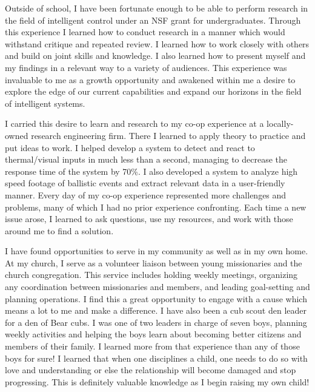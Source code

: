 \documentclass{article}
\begin{document}
Outside of school, I have been fortunate enough to be able to perform research in the field of intelligent control under an NSF grant for undergraduates. Through this experience I learned how to conduct research in a manner which would withstand critique and repeated review. I learned how to work closely with others and build on joint skills and knowledge. I also learned how to present myself and my findings in a relevant way to a variety of audiences. This experience was invaluable to me as a growth opportunity and awakened within me a desire to explore the edge of our current capabilities and expand our horizons in the field of intelligent systems.

I carried this desire to learn and research to my co-op experience at a locally-owned research engineering firm. There I learned to apply theory to practice and put ideas to work. I helped develop a system to detect and react to thermal/visual inputs in much less than a second, managing to decrease the response time of the system by 70\%. I also developed a system to analyze high speed footage of ballistic events and extract relevant data in a user-friendly manner. Every day of my co-op experience represented more challenges and problems, many of which I had no prior experience confronting. Each time a new issue arose, I learned to ask questions, use my resources, and work with those around me to find a solution.

I have found opportunities to serve in my community as well as in my own home. At my church, I serve as a volunteer liaison between young missionaries and the church congregation. This service includes holding weekly meetings, organizing any coordination between missionaries and members, and leading goal-setting and planning operations. I find this a great opportunity to engage with a cause which means a lot to me and make a difference. I have also been a cub scout den leader for a den of Bear cubs. I was one of two leaders in charge of seven boys, planning weekly activities and helping the boys learn about becoming better citizens and members of their family. I learned more from that experience than any of those boys for sure! I learned that when one disciplines a child, one needs to do so with love and understanding or else the relationship will become damaged and stop progressing. This is definitely valuable knowledge as I begin raising my own child!
\end{document}
